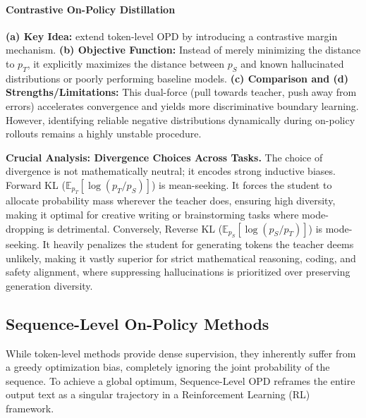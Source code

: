 \paragraph{Contrastive On-Policy Distillation}
\textbf{(a) Key Idea:} \citet{2403.14608} extend token-level OPD by introducing a contrastive margin mechanism. 
\textbf{(b) Objective Function:} Instead of merely minimizing the distance to $p_T$, it explicitly maximizes the distance between $p_S$ and known hallucinated distributions or poorly performing baseline models.
\textbf{(c) Comparison and (d) Strengths/Limitations:} This dual-force (pull towards teacher, push away from errors) accelerates convergence and yields more discriminative boundary learning. However, identifying reliable negative distributions dynamically during on-policy rollouts remains a highly unstable procedure.

\textbf{Crucial Analysis: Divergence Choices Across Tasks.} The choice of divergence is not mathematically neutral; it encodes strong inductive biases. Forward KL ($\mathbb{E}_{p_T}[\log(p_T/p_S)]$) is mean-seeking. It forces the student to allocate probability mass wherever the teacher does, ensuring high diversity, making it optimal for creative writing or brainstorming tasks where mode-dropping is detrimental. Conversely, Reverse KL ($\mathbb{E}_{p_S}[\log(p_S/p_T)]$) is mode-seeking. It heavily penalizes the student for generating tokens the teacher deems unlikely, making it vastly superior for strict mathematical reasoning, coding, and safety alignment, where suppressing hallucinations is prioritized over preserving generation diversity.

\subsection{Sequence-Level On-Policy Methods}
\label{subsec:sequence_level}

While token-level methods provide dense supervision, they inherently suffer from a greedy optimization bias, completely ignoring the joint probability of the sequence. To achieve a global optimum, Sequence-Level OPD reframes the entire output text as a singular trajectory in a Reinforcement Learning (RL) framework.

